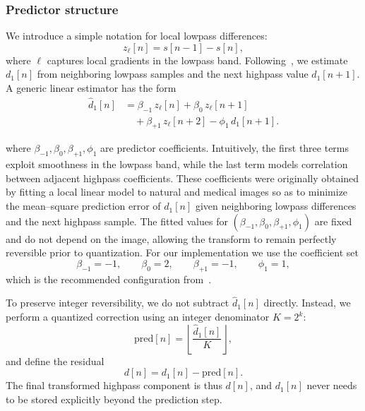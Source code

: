 \subsubsection{Predictor structure}

We introduce a simple notation for local lowpass differences:
\begin{equation}
    z_\ell[n] = s[n-1] - s[n],
\end{equation}
where $ \ell$ captures local gradients in the lowpass band. Following~\cite{said1993sp}, we estimate $d_1[n]$ from neighboring lowpass samples and the next highpass value $d_1[n+1]$. A generic linear estimator has the form
\begin{equation}
\begin{aligned}
\hat d_1[n] 
    &= \beta_{-1} \, z_\ell[n] 
     + \beta_0   \, z_\ell[n+1] \\
    &\quad + \beta_{+1} \, z_\ell[n+2]
     - \phi_1 \, d_1[n+1].
\end{aligned}
\end{equation}

where $\beta_{-1}, \beta_0, \beta_{+1}, \phi_1$ are predictor coefficients. Intuitively, the first three terms exploit smoothness in the lowpass band, while the last term models correlation between adjacent highpass coefficients. These coefficients were originally obtained by fitting a local linear model to natural and medical images so as to 
minimize the mean–square prediction error of $d_1[n]$ given neighboring lowpass differences and the next highpass 
sample. The fitted values for $(\beta_{-1},\beta_0,\beta_{+1},\phi_1)$ are fixed and do not depend on the image, 
allowing the transform to remain perfectly reversible prior to quantization. For our implementation we use the coefficient set
\[
\beta_{-1}=-1,\qquad \beta_0=2,\qquad \beta_{+1}=-1,\qquad \phi_1=1,
\]
which is the recommended configuration from~\cite{said1993sp}.


To preserve integer reversibility, we do not subtract $\hat{d}_1[n]$ directly. Instead, we perform a quantized correction using an integer denominator $K = 2^{k}$:
\begin{equation}
    \mathrm{pred}[n] = \left\lfloor \frac{\hat{d}_1[n]}{K} \right\rfloor,
\end{equation}
and define the residual
\begin{equation}
    d[n] = d_1[n] - \mathrm{pred}[n].
\end{equation}
The final transformed highpass component is thus $d[n]$, and $d_1[n]$ never needs to be stored explicitly beyond the prediction step.

